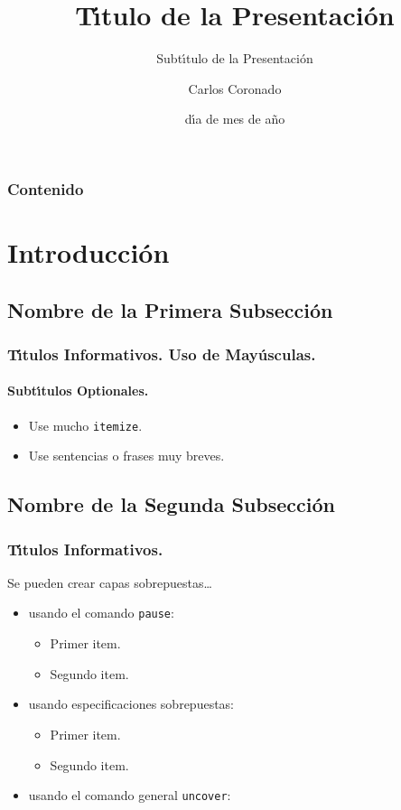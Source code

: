 \documentclass{beamer}  %
\title{T\'{\i}tulo de la Presentaci\'on}
\subtitle{Subt\'{\i}tulo de la Presentaci\'on} %
\author[Coronado] %
{Carlos Coronado}
\institute[ESFM] %
{
  Escuela Superior de F\'{\i}sica y Matem\'aticas\\
  Instituto Polit\'ecnico Nacional}
\date[dd/mm/aa] %
{d\'{\i}a de mes de a\~no}
\begin{document}
\begin{frame}
  \titlepage
\end{frame}

\begin{frame}
  \frametitle{Contenido}
  \tableofcontents
\end{frame}


\section{Introducci\'on}

\subsection[1$^{\mbox{\tiny ra}}$ subsecci\'on]{Nombre de la Primera Subsecci\'on}

\begin{frame}
  \frametitle{T\'{\i}tulos Informativos. Uso de May\'usculas.}
  \framesubtitle{Subt\'{\i}tulos Optionales.}

  \begin{itemize}[<+->] %
  \item Use mucho \texttt{itemize}.
  \item Use sentencias o frases muy breves.
  \end{itemize}

\end{frame}

\subsection[2$^{\mbox{\tiny da}}$ subsecci\'on]{Nombre de la Segunda Subsecci\'on}

\begin{frame}
  \frametitle{T\'{\i}tulos Informativos.}

  Se pueden crear capas sobrepuestas\dots
  \begin{itemize}
  \item usando el comando \texttt{pause}:
    \begin{itemize}
    \item Primer item.  \pause
    \item Segundo item.
    \end{itemize}
  \item usando especificaciones sobrepuestas:
    \begin{itemize}
    \item<3-> Primer item.
    \item<4-> Segundo item.
    \end{itemize}
  \item usando el comando general \texttt{uncover}:
    \begin{itemize}
    \end{itemize}
  \end{itemize}
\end{frame}
\end{document}
